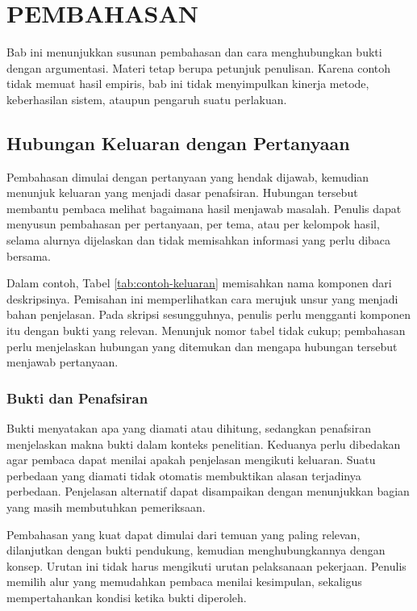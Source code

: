 \chapter{PEMBAHASAN}
\label{bab:pembahasan}

Bab ini menunjukkan susunan pembahasan dan cara menghubungkan bukti dengan argumentasi. Materi tetap berupa petunjuk penulisan. Karena contoh tidak memuat hasil empiris, bab ini tidak menyimpulkan kinerja metode, keberhasilan sistem, ataupun pengaruh suatu perlakuan.

\section{Hubungan Keluaran dengan Pertanyaan}

Pembahasan dimulai dengan pertanyaan yang hendak dijawab, kemudian menunjuk keluaran yang menjadi dasar penafsiran. Hubungan tersebut membantu pembaca melihat bagaimana hasil menjawab masalah. Penulis dapat menyusun pembahasan per pertanyaan, per tema, atau per kelompok hasil, selama alurnya dijelaskan dan tidak memisahkan informasi yang perlu dibaca bersama.

Dalam contoh, Tabel \ref{tab:contoh-keluaran} memisahkan nama komponen dari deskripsinya. Pemisahan ini memperlihatkan cara merujuk unsur yang menjadi bahan penjelasan. Pada skripsi sesungguhnya, penulis perlu mengganti komponen itu dengan bukti yang relevan. Menunjuk nomor tabel tidak cukup; pembahasan perlu menjelaskan hubungan yang ditemukan dan mengapa hubungan tersebut menjawab pertanyaan.

\subsection{Bukti dan Penafsiran}

Bukti menyatakan apa yang diamati atau dihitung, sedangkan penafsiran menjelaskan makna bukti dalam konteks penelitian. Keduanya perlu dibedakan agar pembaca dapat menilai apakah penjelasan mengikuti keluaran. Suatu perbedaan yang diamati tidak otomatis membuktikan alasan terjadinya perbedaan. Penjelasan alternatif dapat disampaikan dengan menunjukkan bagian yang masih membutuhkan pemeriksaan.

Pembahasan yang kuat dapat dimulai dari temuan yang paling relevan, dilanjutkan dengan bukti pendukung, kemudian menghubungkannya dengan konsep. Urutan ini tidak harus mengikuti urutan pelaksanaan pekerjaan. Penulis memilih alur yang memudahkan pembaca menilai kesimpulan, sekaligus mempertahankan kondisi ketika bukti diperoleh.

